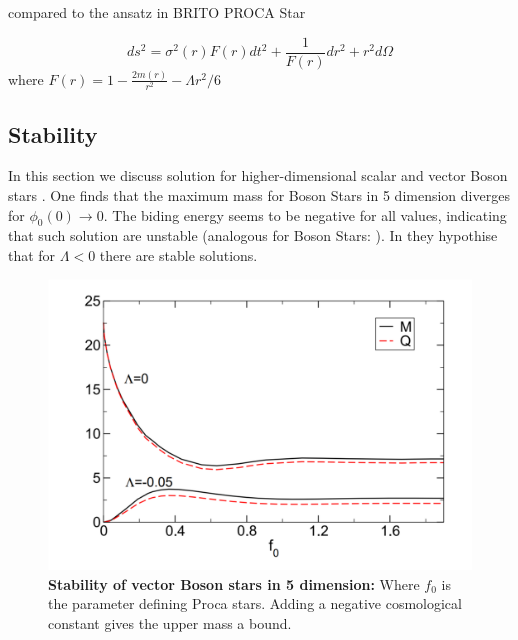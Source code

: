 \documentclass{article}
\begin{document}
compared to the ansatz in BRITO PROCA Star

\begin{equation}
ds^2 = \sigma^2(r)F(r)dt^2+ \frac{1}{F(r)}dr^2+r^2d\Omega
\end{equation}
where $F(r) = 1 - \frac{2 m(r)}{r^2}-\Lambda r^2/6$  

\subsection{Stability}
In this section we discuss solution for higher-dimensional scalar and vector Boson stars \cite{Duarte:2016lig}. One finds that the maximum mass for Boson Stars in 5 dimension diverges for $\phi_0(0) \rightarrow 0 $. The biding energy seems to be negative for all values, indicating that such solution are unstable (analogous for Boson Stars: \cite{Brihaye:2015jja}). In \cite{Duarte:2016lig} they hypothise that for $\Lambda < 0$ there are stable solutions.  

\begin{figure}
  \includegraphics[width=\linewidth]{StabileADs.png}
	\caption{{\bf Stability of vector Boson stars in 5 dimension:} Where $f_0$ is the parameter defining Proca stars. Adding a negative cosmological constant gives the upper mass a bound.  }
  \label{fig:boat1}
\end{figure}

{}

\end{document}
